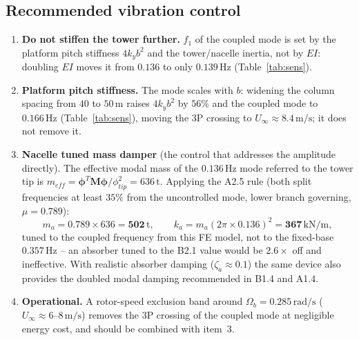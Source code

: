 \documentclass[11pt,a4paper]{article}
\begin{document}
\subsection*{Recommended vibration control}
\begin{enumerate}
\item \textbf{Do not stiffen the tower further.} $f_1$ of the coupled mode is set by the platform pitch stiffness $4k_yb^2$ and the tower/nacelle inertia, not by $EI$: doubling $EI$ moves it from $0.136$ to only $0.139\,\mathrm{Hz}$ (Table~\ref{tab:sens}).
\item \textbf{Platform pitch stiffness.} The mode scales with $b$: widening the column spacing from $40$ to $50\,\mathrm{m}$ raises $4k_yb^2$ by $56\%$ and the coupled mode to $0.166\,\mathrm{Hz}$ (Table~\ref{tab:sens}), moving the 3P crossing to $U_\infty\approx8.4\,\mathrm{m/s}$; it does not remove it.
\item \textbf{Nacelle tuned mass damper} (the control that addresses the amplitude directly). The effective modal mass of the $0.136\,\mathrm{Hz}$ mode referred to the tower tip is $m_{eff}=\boldsymbol\phi^T\mathbf M\boldsymbol\phi/\phi_{tip}^2=636\,\mathrm{t}$. Applying the A2.5 rule (both split frequencies at least $35\%$ from the uncontrolled mode, lower branch governing, $\mu=0.789$):
\[
m_a=0.789\times636=\mathbf{502\,\mathrm{t}},\qquad k_a=m_a(2\pi\times0.136)^2=\mathbf{367\,\mathrm{kN/m}},
\]
tuned to the coupled frequency from this FE model, not to the fixed-base $0.357\,\mathrm{Hz}$ -- an absorber tuned to the B2.1 value would be $2.6\times$ off and ineffective. With realistic absorber damping ($\zeta_a\approx0.1$) the same device also provides the doubled modal damping recommended in B1.4 and A1.4.
\item \textbf{Operational.} A rotor-speed exclusion band around $\Omega_b=0.285\,\mathrm{rad/s}$ ($U_\infty\approx6$--$8\,\mathrm{m/s}$) removes the 3P crossing of the coupled mode at negligible energy cost, and should be combined with item~3.
\end{enumerate}
\end{document}
